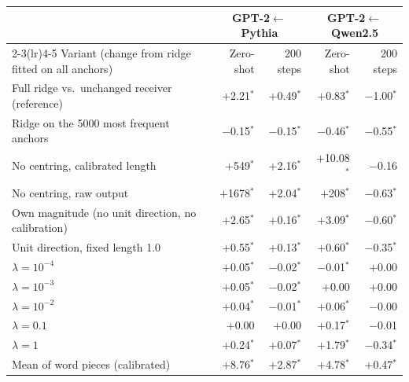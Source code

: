 \begin{tabular}{lrrrr}
\toprule
 & \multicolumn{2}{c}{GPT-2$\leftarrow$Pythia} & \multicolumn{2}{c}{GPT-2$\leftarrow$Qwen2.5} \\
\cmidrule(lr){2-3}\cmidrule(lr){4-5}
Variant (change from ridge fitted on all anchors) & Zero-shot & 200 steps & Zero-shot & 200 steps \\
\midrule
Full ridge vs.\ unchanged receiver (reference) & $+$2.21$^{*}$ & $+$0.49$^{*}$ & $+$0.83$^{*}$ & $-$1.00$^{*}$ \\
\midrule
Ridge on the 5000 most frequent anchors & $-$0.15$^{*}$ & $-$0.15$^{*}$ & $-$0.46$^{*}$ & $-$0.55$^{*}$ \\
No centring, calibrated length & $+$549$^{*}$ & $+$2.16$^{*}$ & $+$10.08$^{*}$ & $-$0.16 \\
No centring, raw output & $+$1678$^{*}$ & $+$2.04$^{*}$ & $+$208$^{*}$ & $-$0.63$^{*}$ \\
Own magnitude (no unit direction, no calibration) & $+$2.65$^{*}$ & $+$0.16$^{*}$ & $+$3.09$^{*}$ & $-$0.60$^{*}$ \\
Unit direction, fixed length 1.0 & $+$0.55$^{*}$ & $+$0.13$^{*}$ & $+$0.60$^{*}$ & $-$0.35$^{*}$ \\
$\lambda=10^{-4}$ & $+$0.05$^{*}$ & $-$0.02$^{*}$ & $-$0.01$^{*}$ & $+$0.00 \\
$\lambda=10^{-3}$ & $+$0.05$^{*}$ & $-$0.02$^{*}$ & $+$0.00 & $+$0.00 \\
$\lambda=10^{-2}$ & $+$0.04$^{*}$ & $-$0.01$^{*}$ & $+$0.06$^{*}$ & $-$0.00 \\
$\lambda=0.1$ & $+$0.00 & $+$0.00 & $+$0.17$^{*}$ & $-$0.01 \\
$\lambda=1$ & $+$0.24$^{*}$ & $+$0.07$^{*}$ & $+$1.79$^{*}$ & $-$0.34$^{*}$ \\
Mean of word pieces (calibrated) & $+$8.76$^{*}$ & $+$2.87$^{*}$ & $+$4.78$^{*}$ & $+$0.47$^{*}$ \\
\bottomrule
\end{tabular}
